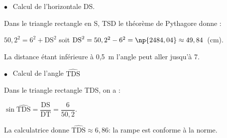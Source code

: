 
\medskip 

%
%
%
%
%
%
%
%
$\bullet~~$ Calcul de l'horizontale DS.

Dans le triangle rectangle en S, TSD le théorème de Pythagore donne :

$50,2^2 = 6^2 + \text{DS}^2$ soit  $\text{DS}^2 = 50,2^2 - 6^2 = \np{2484,04} \approx 49,84$~(cm).

La distance étant inférieure à 0,5~m l'angle peut aller jusqu'à 7\degres.

$\bullet~~$ Calcul de l'angle $\widehat{\text{TDS}}$

Dans le triangle rectangle TDS, on a :

$\sin \widehat{\text{TDS}} = \dfrac{\text{DS}}{\text{DT}} = \dfrac{6}{50,2}$.

La calculatrice donne $\widehat{\text{TDS}} \approx 6,86$\degres : la rampe est conforme à la norme. 
